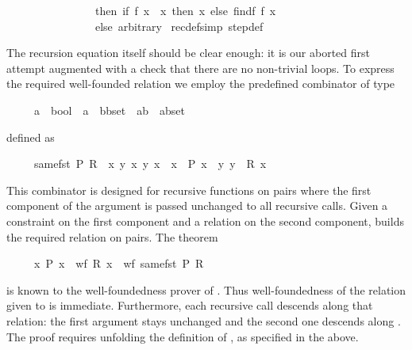 \begin{isabellebody}
\ \ \ \ \ \ \ \ \ \ \ \ \ \ \ \ then\ if\ f\ x\ {\isacharequal}\ x\ then\ x\ else\ find{\isacharparenleft}f{\isacharcomma}\ f\ x{\isacharparenright}\isanewline
\ \ \ \ \ \ \ \ \ \ \ \ \ \ \ \ else\ arbitrary{\isacharparenright}{\isachardoublequoteclose}\isanewline
{\isacharparenleft}\ recdef{\isacharunderscore}simp{\isacharcolon}\ step{}{\isacharunderscore}def{\isacharparenright}%
\begin{isamarkuptext}%
\noindent
The recursion equation itself should be clear enough: it is our aborted
first attempt augmented with a check that there are no non-trivial loops.
To express the required well-founded relation we employ the
predefined combinator  of type
\begin{isabelle}%
\ \ \ \ \ {\isacharparenleft}{\isacharprime}a\ {\isasymRightarrow}\ bool{\isacharparenright}\ {\isasymRightarrow}\ {\isacharparenleft}{\isacharprime}a\ {\isasymRightarrow}\ {\isacharparenleft}{\isacharprime}b{\isasymtimes}{\isacharprime}b{\isacharparenright}set{\isacharparenright}\ {\isasymRightarrow}\ {\isacharparenleft}{\isacharparenleft}{\isacharprime}a{\isasymtimes}{\isacharprime}b{\isacharparenright}\ {\isasymtimes}\ {\isacharparenleft}{\isacharprime}a{\isasymtimes}{\isacharprime}b{\isacharparenright}{\isacharparenright}set%
\end{isabelle}
defined as
\begin{isabelle}%
\ \ \ \ \ same{\isacharunderscore}fst\ P\ R\ {\isasymequiv}\ {\isacharbraceleft}{\isacharparenleft}{\isacharparenleft}x{\isacharprime}{\isacharcomma}\ y{\isacharprime}{\isacharparenright}{\isacharcomma}\ x{\isacharcomma}\ y{\isacharparenright}{\isachardot}\ x{\isacharprime}\ {\isacharequal}\ x\ {\isasymand}\ P\ x\ {\isasymand}\ {\isacharparenleft}y{\isacharprime}{\isacharcomma}\ y{\isacharparenright}\ {\isasymin}\ R\ x{\isacharbraceright}%
\end{isabelle}
This combinator is designed for
recursive functions on pairs where the first component of the argument is
passed unchanged to all recursive calls. Given a constraint on the first
component and a relation on the second component,  builds the
required relation on pairs.  The theorem
\begin{isabelle}%
\ \ \ \ \ {\isacharparenleft}{\isasymAnd}x{\isachardot}\ P\ x\ {\isasymLongrightarrow}\ wf\ {\isacharparenleft}R\ x{\isacharparenright}{\isacharparenright}\ {\isasymLongrightarrow}\ wf\ {\isacharparenleft}same{\isacharunderscore}fst\ P\ R{\isacharparenright}%
\end{isabelle}
is known to the well-foundedness prover of .  Thus
well-foundedness of the relation given to  is immediate.
Furthermore, each recursive call descends along that relation: the first
argument stays unchanged and the second one descends along . The proof requires unfolding the definition of ,
as specified in the  above.


\end{isamarkuptext}
\end{isabellebody}
